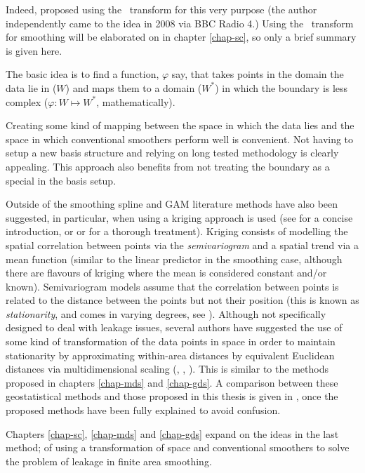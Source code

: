 \begin{enumerate}
Indeed,  proposed using the \sch\ transform for this very purpose (the author independently came to the idea in 2008 via BBC Radio 4.) Using the \sch\ transform for smoothing will be elaborated on in chapter \ref{chap-sc}, so only a brief summary is given here.

The basic idea is to find a function, $\varphi$ say, that takes points in the domain the data lie in ($W$) and maps them to a domain ($W^*$) in which the boundary is less complex ($\varphi : W \mapsto W^*$, mathematically).

Creating some kind of mapping between the space in which the data lies and the space in which conventional smoothers perform well is convenient. Not having to setup a new basis structure and relying on long tested methodology is clearly appealing. This approach also benefits from not treating the boundary as a special in the basis setup.
\end{enumerate}

Outside of the smoothing spline and GAM literature methods have also been suggested, in particular, when using a kriging approach is used (see \cite[pp. 425-430]{MASS} for a concise introduction, or \cite{schabenberger} or \cite{diggle} for a thorough treatment). Kriging consists of modelling the spatial correlation between points via the \textit{semivariogram} and a spatial trend via a mean function (similar to the linear predictor in the smoothing case, although there are flavours of kriging where the mean is considered constant and/or known). Semivariogram models assume that the correlation between points is related to the distance between the points but not their position (this is known as \textit{stationarity}, and comes in varying degrees, see \cite[pp. 42-44]{schabenberger}). Although not specifically designed to deal with leakage issues, several authors have suggested the use of some kind of transformation of the data points in space in order to maintain stationarity by approximating within-area distances by equivalent Euclidean distances  via multidimensional scaling (\cite{mdskrig}, \cite{crabkrig}, \cite{curriero}). This is similar to the methods proposed in chapters  \ref{chap-mds} and \ref{chap-gds}. A comparison between these geostatistical methods and those proposed in this thesis is given in , once the proposed methods have been fully explained to avoid confusion.

Chapters \ref{chap-sc}, \ref{chap-mds} and \ref{chap-gds} expand on the ideas in the last method; of using a transformation of space and conventional smoothers to solve the problem of leakage in finite area smoothing.



